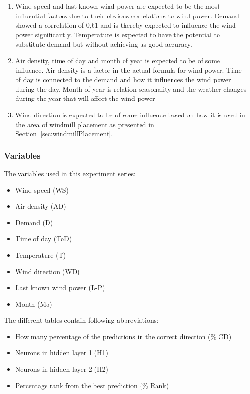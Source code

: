 \begin{enumerate}
\item Wind speed and last known wind power are expected to be the most influential factors due to their obvious correlations to wind power. Demand showed a correlation of 0,61 and is thereby expected to influence the wind power significantly. Temperature is expected to have the potential to substitute demand but without achieving as good accuracy. 
\item Air density, time of day and month of year is expected to be of some influence. Air density is a factor in the actual formula for wind power. Time of day is connected to the demand and how it influences the wind power during the day. Month of year is relation seasonality and the weather changes during the year that will affect the wind power. 
\item Wind direction is expected to be of some influence based on how it is used in the area of windmill placement as presented in Section~\ref{sec:windmillPlacement}.
\end{enumerate}

\subsubsection{Variables}
The variables used in this experiment series:

\begin{itemize}
\item Wind speed (WS)
\item Air density (AD)
\item Demand (D)
\item Time of day (ToD)
\item Temperature (T)
\item Wind direction (WD)
\item Last known wind power (L-P)
\item Month (Mo)
\end{itemize}

The different tables contain following abbreviations:

\begin{itemize}
\item How many percentage of the predictions in the correct direction (\% CD)
\item Neurons in hidden layer 1 (H1)
\item Neurons in hidden layer 2 (H2)
\item Percentage rank from the best prediction (\% Rank)
\end{itemize}

